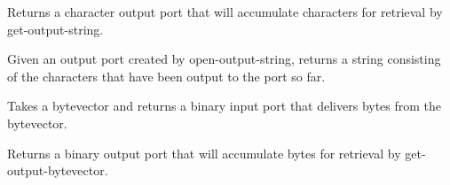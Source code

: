 \begin{entry}{%
}

Returns a character output port that will accumulate characters for
retrieval by {\cf get-output-string}.

\end{entry}

\begin{entry}{%
}

Given an output port created by {\cf open-output-string}, returns a
string consisting of the characters that have been output to the port
so far.
\end{entry}



\begin{entry}{%
}

Takes a bytevector and returns a binary input port that delivers
bytes from the bytevector.


\end{entry}

\begin{entry}{%
}

Returns a binary output port that will accumulate bytes for
retrieval by {\cf get-output-bytevector}.

\end{entry}


